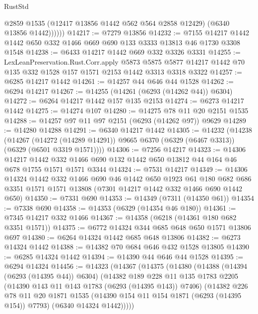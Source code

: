 \begin{lexlean}{RustStd}
\begin{coremodule}
{{              @2859
              @1535
              (@12417 @13856 @1442 @562 @564 @2858 @12429)
              (@6340 @13856 @1442))))))
@14217 := @7279 @13856
@14232 := @7155 @14217 @1442 @1442 @650 @332 @1466 @669 @690 @133 @3333 @13813 @46 @1730 @3308 @1548
@14238 := @6433 @14217 @1442 @669 @332 @3326 @3331
@14255 := LexLeanPreservation.Rust.Corr.apply
    @5873
    @5875
    @5877
    @14217
    @1442
    @70
    @135
    @332
    @1528
    @157
    @1571
    @2153
    @1442
    @3313
    @3318
    @3322
@14257 := @6285 @14217 @1442
@14261 := @14257 @44 @646 @44 @1528
@14262 := @6294 @14217
@14267 := @14255 (@14261 (@6293 (@14262 @44)) @6304)
@14272 := @6264 @14217 @1442 @157 @135 @2153
@14274 := @6273 @14217 @1442
@14275 := @14274 @107
@14280 := @14275 @78 @11 @20 @2151 @1535
@14288 := @14257 @97 @11 @97 @2151 (@6293 (@14262 @97)) @9629
@14289 := @14280 @14288
@14291 := @6340 @14217 @1442
@14305 := @14232
    (@14238
      (@14267
        (@14272 (@14289 @14291))
        @9665
        @6370
        (@6329 (@6467 @3313))
        (@6329 (@6501 @3319 @1571))))
@14306 := @7256 @14217
@14323 := @14306
    @14217
    @1442
    @332
    @1466
    @690
    @132
    @1442
    @650
    @13812
    @44
    @164
    @46
    @678
    @1755
    @1571
    @1571
    @3344
@14324 := @7531 @14217
@14349 := @14306
    @14324
    @1442
    @332
    @1466
    @690
    @46
    @1442
    @650
    @1923
    @61
    @180
    @682
    @686
    @3351
    @1571
    @1571
    @13808
    (@7301 @14217 @1442 @332 @1466 @690 @1442 @650)
@14350 := @7331 @690
@14353 := @14349 (@7311 (@14350 @61))
@14354 := @7338 @690
@14358 := @14353 (@6329 (@14354 @46 @180))
@14361 := @7345 @14217 @332 @1466
@14367 := @14358 (@6218 (@14361 @180 @682 @3351 @1571))
@14375 := @6772 @14324 @344 @685 @648 @650 @1571 @13806 @697
@14380 := @6264 @14324 @1442 @685 @648 @13806
@14382 := @6273 @14324 @1442
@14388 := @14382 @70 @684 @646 @432 @1528 @13805
@14390 := @6285 @14324 @1442
@14394 := @14390 @44 @646 @44 @1528
@14395 := @6294 @14324
@14456 := @14323
    (@14367
      (@14375
        (@14380
          (@14388
            (@14394 (@6293 (@14395 @44)) @6304)
            (@14382
              @189
              @228
              @11
              @135
              @1783
              @2205
              (@14390 @143 @11 @143 @1783 (@6293 (@14395 @143)) @7406)
              (@14382
                @226
                @78
                @11
                @20
                @1871
                @1535
                (@14390 @154 @11 @154 @1871 (@6293 (@14395 @154)) @7793)
                (@6340 @14324 @1442)))))
}}
\end{coremodule}
\end{lexlean}
